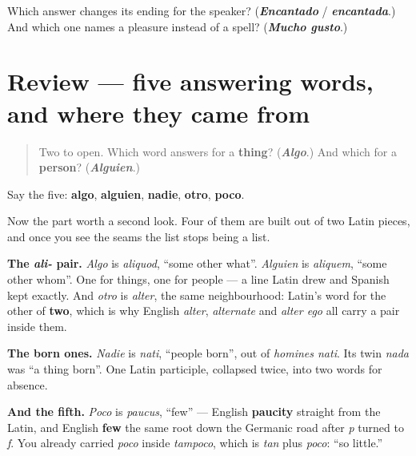 \begin{tcolorbox}[breakable,colback=teal!4,colframe=teal!35!black,title={Before you move on}]
Which answer changes its ending for the speaker? (\emph{\textbf{Encantado}} / \emph{\textbf{encantada}}.) And which one names a pleasure instead of a spell? (\emph{\textbf{Mucho gusto}}.)
\end{tcolorbox}
\section[(review)]{Review — five answering words, and where they came from}

\label{lesson:ES-C319-repaso-respuestas}



\begin{quote}
Two to open. Which word answers for a \textbf{thing}? (\emph{\textbf{Algo}}.) And which for a \textbf{person}? (\emph{\textbf{Alguien}}.)
\end{quote}

\begin{grammarlens}[title={What you've built}]
Say the five: \textbf{algo}, \textbf{alguien}, \textbf{nadie}, \textbf{otro}, \textbf{poco}.

Now the part worth a second look. Four of them are built out of two Latin pieces, and once you see the seams the list stops being a list.

\textbf{The \emph{ali-} pair.} \emph{Algo} is \emph{aliquod}, \textquotedblleft{}some other what\textquotedblright{}. \emph{Alguien} is \emph{aliquem}, \textquotedblleft{}some other whom\textquotedblright{}. One for things, one for people — a line Latin drew and Spanish kept exactly. And \emph{otro} is \emph{alter}, the same neighbourhood: Latin's word for the other of \textbf{two}, which is why English \emph{alter}, \emph{alternate} and \emph{alter ego} all carry a pair inside them.

\textbf{The born ones.} \emph{Nadie} is \emph{nati}, \textquotedblleft{}people born\textquotedblright{}, out of \emph{homines nati}. Its twin \emph{nada} was \textquotedblleft{}a thing born\textquotedblright{}. One Latin participle, collapsed twice, into two words for absence.

\textbf{And the fifth.} \emph{Poco} is \emph{paucus}, \textquotedblleft{}few\textquotedblright{} — English \textbf{paucity} straight from the Latin, and English \textbf{few} the same root down the Germanic road after \emph{p} turned to \emph{f}. You already carried \emph{poco} inside \emph{tampoco}, which is \emph{tan} plus \emph{poco}: \textquotedblleft{}so little.\textquotedblright{}
\end{grammarlens}

